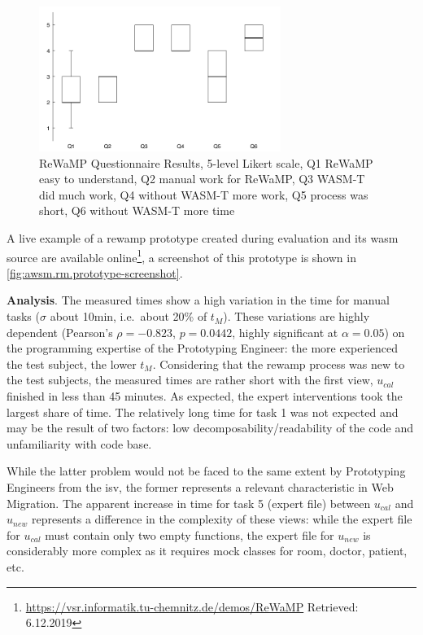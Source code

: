 \begin{figure}
\hypertarget{fig:rewamp.boxplot}{%
\centering
\includegraphics[width=0.7\textwidth]{../figures/boxplots/rewamp-boxplot.pdf}
\caption[ReWaMP Questionnaire Results]{ReWaMP Questionnaire Results, 5-level Likert scale, Q1 ReWaMP easy to understand, Q2 manual work for ReWaMP, Q3 WASM-T did much work, Q4 without WASM-T more work, Q5 process was short, Q6 without WASM-T more time}\label{fig:rewamp.boxplot}
}
\end{figure}

A live example of a \gls{rewamp} prototype created during evaluation and its \gls{wasm} source are available online\footnote{\url{https://vsr.informatik.tu-chemnitz.de/demos/ReWaMP} Retrieved: 6.12.2019}, a screenshot of this prototype is shown in \cref{fig:awsm.rm.prototype-screenshot}.

\textbf{Analysis}. The measured times show a high variation in the time for manual tasks (\(\sigma\) about 10min, i.e.~about 20\% of \(t_M\)).
These variations are highly dependent (Pearson's \(\rho=-0.823\), \(p=0.0442\), highly significant at \(\alpha = 0.05\)) on the programming expertise of the Prototyping Engineer: the more experienced the test subject, the lower \(t_M\).
Considering that the \gls{rewamp} process was new to the test subjects, the measured times are rather short with the first view, \(u_{cal}\) finished in less than 45 minutes.
As expected, the expert interventions took the largest share of time.
The relatively long time for task 1 was not expected and may be the result of two factors: low decomposability/readability of the  code and unfamiliarity with code base.

While the latter problem would not be faced to the same extent by Prototyping Engineers from the \gls{isv}, the former represents a relevant characteristic in \gls{Web Migration}.
The apparent increase in time for task 5 (expert file) between \(u_{cal}\) and \(u_{new}\) represents a difference in the complexity of these views: while the expert file for \(u_{cal}\) must contain only two empty functions, the expert file for \(u_{new}\) is considerably more complex as it requires mock classes for room, doctor, patient, etc.

